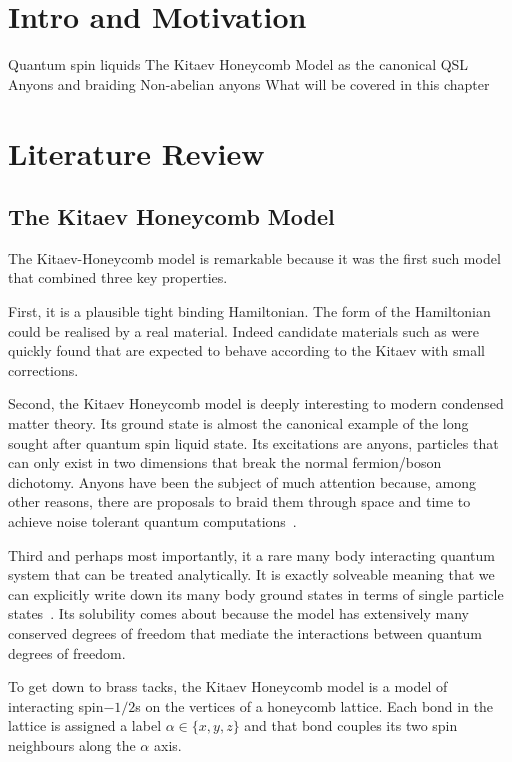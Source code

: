 \section{Intro and Motivation}
		Quantum spin liquids
		The Kitaev Honeycomb Model as the canonical QSL
		Anyons and braiding
		Non-abelian anyons
        What will be covered in this chapter
	
\section{Literature Review} 
\subsection{The Kitaev Honeycomb Model}

The Kitaev-Honeycomb model is remarkable because it was the first such model that combined three key properties.

First, it is a plausible tight binding Hamiltonian. The form of the Hamiltonian could be realised by a real material. Indeed candidate materials such as  were quickly found \cite{banerjeeProximateKitaevQuantum2016, trebstKitaevMaterials2022} that are expected to behave according to the Kitaev with small corrections. 

Second, the Kitaev Honeycomb model is deeply interesting to modern condensed matter theory. Its ground state is almost the canonical example of the long sought after quantum spin liquid state. Its excitations are anyons, particles that can only exist in two dimensions that break the normal fermion/boson dichotomy. Anyons have been the subject of much attention because, among other reasons, there are proposals to braid them through space and time to achieve noise tolerant quantum computations~\cite{freedmanTopologicalQuantumComputation2003}. 

Third and perhaps most importantly, it a rare many body interacting quantum system that can be treated analytically. It is exactly solveable meaning that we can explicitly write down its many body ground states in terms of single particle states~\cite{kitaevAnyonsExactlySolved2006}. Its solubility comes about because the model has extensively many conserved degrees of freedom that mediate the interactions between quantum degrees of freedom.

To get down to brass tacks, the Kitaev Honeycomb model is a model of interacting spin$-1/2$s on the vertices of a honeycomb lattice. Each bond in the lattice is assigned a label $\alpha \in \{ x, y, z\}$ and that bond couples its two spin neighbours along the $\alpha$ axis. 

